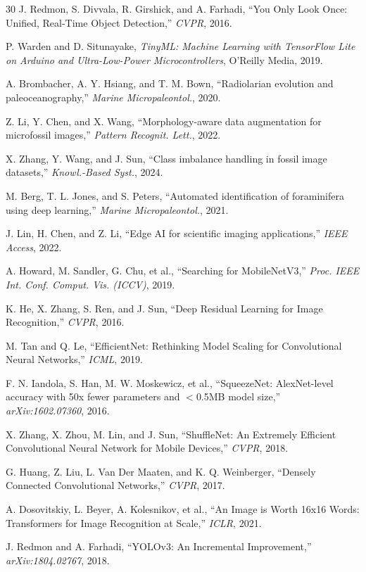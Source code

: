 \documentclass[a4paper,fleqn]{cas-sc}
\begin{document}
\begin{thebibliography}{30}
J. Redmon, S. Divvala, R. Girshick, and A. Farhadi, ``You Only Look Once: Unified,
Real-Time Object Detection,'' \emph{CVPR}, 2016.

P. Warden and D. Situnayake, \emph{TinyML: Machine Learning with TensorFlow Lite on Arduino
and Ultra-Low-Power Microcontrollers}, O'Reilly Media, 2019.

A. Brombacher, A. Y. Hsiang, and T. M. Bown, ``Radiolarian evolution and
paleoceanography,'' \emph{Marine Micropaleontol.}, 2020.

Z. Li, Y. Chen, and X. Wang, ``Morphology-aware data augmentation for microfossil images,''
\emph{Pattern Recognit. Lett.}, 2022.

X. Zhang, Y. Wang, and J. Sun, ``Class imbalance handling in fossil image datasets,''
\emph{Knowl.-Based Syst.}, 2024.

M. Berg, T. L. Jones, and S. Peters, ``Automated identification of foraminifera using deep
learning,'' \emph{Marine Micropaleontol.}, 2021.

J. Lin, H. Chen, and Z. Li, ``Edge AI for scientific imaging applications,'' \emph{IEEE Access}, 2022.

A. Howard, M. Sandler, G. Chu, et al., ``Searching for MobileNetV3,'' \emph{Proc. IEEE Int. Conf. Comput. Vis. (ICCV)}, 2019.

K. He, X. Zhang, S. Ren, and J. Sun, ``Deep Residual Learning for Image Recognition,'' \emph{CVPR}, 2016.

M. Tan and Q. Le, ``EfficientNet: Rethinking Model Scaling for Convolutional Neural Networks,'' \emph{ICML}, 2019.

F. N. Iandola, S. Han, M. W. Moskewicz, et al., ``SqueezeNet: AlexNet-level accuracy with 50x fewer parameters and $<$0.5MB model size,'' \emph{arXiv:1602.07360}, 2016.

X. Zhang, X. Zhou, M. Lin, and J. Sun, ``ShuffleNet: An Extremely Efficient Convolutional Neural Network for Mobile Devices,'' \emph{CVPR}, 2018.

G. Huang, Z. Liu, L. Van Der Maaten, and K. Q. Weinberger, ``Densely Connected Convolutional Networks,'' \emph{CVPR}, 2017.

A. Dosovitskiy, L. Beyer, A. Kolesnikov, et al., ``An Image is Worth 16x16 Words: Transformers for Image Recognition at Scale,'' \emph{ICLR}, 2021.

J. Redmon and A. Farhadi, ``YOLOv3: An Incremental Improvement,'' \emph{arXiv:1804.02767}, 2018.

\end{thebibliography}
\end{document}
